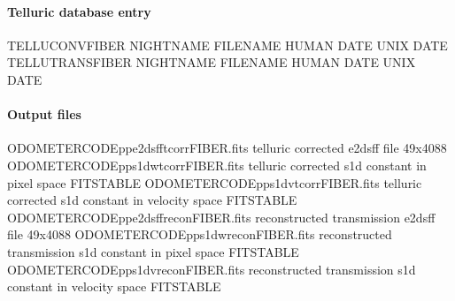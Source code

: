 \documentclass[a4paper,10pt,english]{report}
\begin{document}
\paragraph{Telluric database entry}
\label{\detokenize{user/spirou/recipes/fit_tellu:telluric-database-entry}}
\begin{sphinxVerbatim}[commandchars=\\\{\}]
TELLU\PYGZus{}CONV\PYGZus{}FIBER NIGHT\PYGZus{}NAME FILENAME HUMAN DATE UNIX DATE
TELLU\PYGZus{}TRANS\PYGZus{}FIBER NIGHT\PYGZus{}NAME FILENAME HUMAN DATE UNIX DATE
\end{sphinxVerbatim}


\paragraph{Output files}
\label{\detokenize{user/spirou/recipes/fit_tellu:output-files}}
\begin{sphinxVerbatim}[commandchars=\\\{\}]
ODOMETER\PYGZus{}CODE\PYGZus{}pp\PYGZus{}e2dsff\PYGZus{}tcorr\PYGZus{}FIBER.fits     telluric corrected e2dsff file 49x4088
ODOMETER\PYGZus{}CODE\PYGZus{}pp\PYGZus{}s1d\PYGZus{}w\PYGZus{}tcorr\PYGZus{}FIBER.fits      telluric corrected s1d constant in pixel space FITS\PYGZhy{}TABLE
ODOMETER\PYGZus{}CODE\PYGZus{}pp\PYGZus{}s1d\PYGZus{}v\PYGZus{}tcorr\PYGZus{}FIBER.fits      telluric corrected s1d constant in velocity space FITS\PYGZhy{}TABLE
ODOMETER\PYGZus{}CODE\PYGZus{}pp\PYGZus{}e2dsff\PYGZus{}recon\PYGZus{}FIBER.fits     reconstructed transmission e2dsff file 49x4088
ODOMETER\PYGZus{}CODE\PYGZus{}pp\PYGZus{}s1d\PYGZus{}w\PYGZus{}recon\PYGZus{}FIBER.fits      reconstructed transmission s1d constant in pixel space FITS\PYGZhy{}TABLE
ODOMETER\PYGZus{}CODE\PYGZus{}pp\PYGZus{}s1d\PYGZus{}v\PYGZus{}recon\PYGZus{}FIBER.fits      reconstructed transmission s1d constant in velocity space FITS\PYGZhy{}TABLE
\end{sphinxVerbatim}
\end{document}
